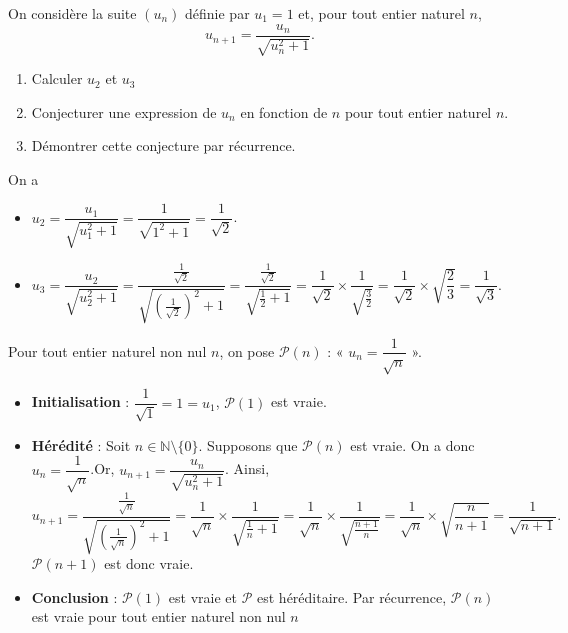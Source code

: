 \documentclass[11pt,fleqn]{book} %
\begin{document}
\begin{exercise}[topic=rec01]
On considère la suite \((u_n)\) définie par \(u_1=1\) et, pour tout entier naturel \(n\), \[u_{n+1}= \dfrac{u_n}{\sqrt{u_n^2+1}}.\]
\begin{enumerate}
 	\item Calculer \(u_2\) et \(u_3\)
 	\item Conjecturer une expression de \(u_n\) en fonction de \(n\) pour tout entier naturel $n$.
 	\item Démontrer cette conjecture par récurrence.
\end{enumerate}\end{exercise}
\begin{solution}On a
\begin{itemize}\item \( u_2 = \dfrac{u_1}{\sqrt{u_1^2+1}}=\dfrac{1}{\sqrt{1^2+1}}=\dfrac{1}{\sqrt{2}}\).
 	\item \( u_3 = \dfrac{u_2}{\sqrt{u_2^2+1}}=\dfrac{\frac{1}{\sqrt{2}}}{\sqrt{\left(\frac{1}{\sqrt{2}}\right)^2+1}}=\dfrac{\frac{1}{\sqrt{2}}}{\sqrt{\frac{1}{2}+1}}=\dfrac{1}{\sqrt{2}} \times \dfrac{1}{\sqrt{\frac{3}{2}}} = \dfrac{1}{\sqrt{2}} \times \sqrt{\dfrac{2}{3}} = \dfrac{1}{\sqrt{3}}\).
\end{itemize}
Pour tout entier naturel non nul \(n\), on pose \(\mathcal{P}(n)\) : « \(u_n=\dfrac{1}{\sqrt{n}}\) ».
\begin{itemize}
\item \textbf{Initialisation} : \( \dfrac{1}{\sqrt{1}}=1=u_1\), \( \mathcal{P}(1) \) est vraie.
\item \textbf{Hérédité} : Soit \(n\in\mathbb{N}\setminus \{0\}\). Supposons que \( \mathcal{P}(n)\) est vraie. On a donc \(u_n=\dfrac{1}{\sqrt{n}}\).Or, $u_{n+1}= \dfrac{u_n}{\sqrt{u_n^2+1}}$. Ainsi,
\[u_{n+1}= \dfrac{\frac{1}{\sqrt{n}}}{\sqrt{\left(\frac{1}{\sqrt{n}}\right)^2+1}}=\dfrac{1}{\sqrt{n}} \times \dfrac{1}{\sqrt{\frac{1}{n}+1}}=\dfrac{1}{\sqrt{n}} \times \dfrac{1}{\sqrt{\frac{n+1}{n}}}=\dfrac{1}{\sqrt{n}} \times \sqrt{\dfrac{n}{n+1}} = \dfrac{1}{\sqrt{n+1}}.\]\( \mathcal{P}(n+1)\) est donc vraie.
\item \textbf{Conclusion} : \(\mathcal{P}(1)\) est vraie et \(\mathcal{P}\) est héréditaire. Par récurrence, \(\mathcal{P}(n)\) est vraie pour tout entier naturel non nul \(n\)
\end{itemize}\end{solution}
\end{document}

